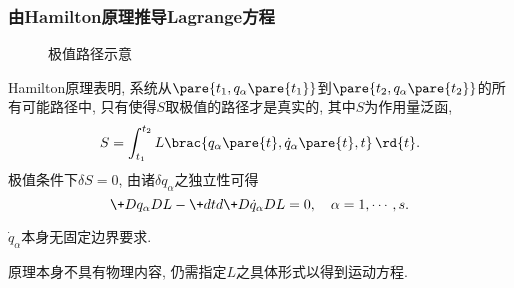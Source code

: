 \documentclass{ctexart}
\begin{document}
\subsubsection{由Hamilton原理推导Lagrange方程} %
\label{ssub:由hamilton原理推导lagrange方程}

\begin{figure}
    \centering
    \caption{极值路径示意}
    \label{fig:极值路径示意}
\end{figure}
Hamilton原理表明, 系统从$\pare{t_1, q_\alpha\pare{t_1}}$到$\pare{t_2, q_\alpha\pare{t_2}}$的所有可能路径中, 只有使得$S$取极值的路径才是真实的, 其中$S$为作用量泛函,
\[ S = \int_{t_1}^{t_2} L\brac{q_\alpha\pare{t},\dot{q}_\alpha\pare{t}, t}\,\rd{t}. \]
极值条件下$\delta S = 0$, 由诸$\delta q_\alpha$之独立性可得
\[ \+D{q_\alpha}DL - \+dtd{} \+D{\dot{q}_\alpha}DL = 0,\quad \alpha = 1,\cdots,s. \]
\begin{remark}
    $\dot{q}_\alpha$本身无固定边界要求.
\end{remark}
\begin{remark}
    原理本身不具有物理内容, 仍需指定$L$之具体形式以得到运动方程.
\end{remark}
\end{document}
